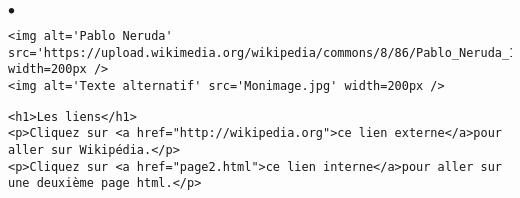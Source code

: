 \documentclass[10pt,dvipsnames, dvips, svgnames]{article}
\begin{document}
\begin{list}{$\bullet$}{}
\item {}
\begin{lstlisting}
<img alt='Pablo Neruda' src='https://upload.wikimedia.org/wikipedia/commons/8/86/Pablo_Neruda_1963.jpg' width=200px />
<img alt='Texte alternatif' src='Monimage.jpg' width=200px />
\end{lstlisting}

\item{}
\begin{lstlisting}
<h1>Les liens</h1>
<p>Cliquez sur <a href="http://wikipedia.org">ce lien externe</a>pour aller sur Wikipédia.</p>
<p>Cliquez sur <a href="page2.html">ce lien interne</a>pour aller sur une deuxième page html.</p>
\end{lstlisting}

\end{list}
\end{document}
